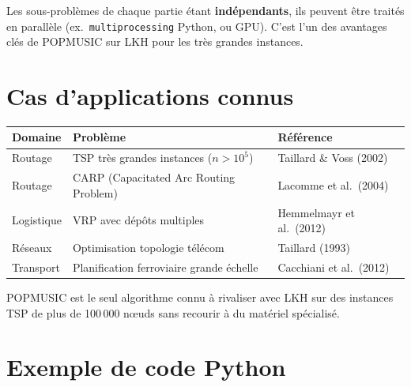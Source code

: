 \documentclass[11pt,a4paper]{article}
\begin{document}
\begin{tcolorbox}[remarque]
Les sous-problèmes de chaque partie étant \textbf{indépendants}, ils peuvent
être traités en parallèle (ex.\ \texttt{multiprocessing} Python, ou GPU).
C'est l'un des avantages clés de POPMUSIC sur LKH pour les très grandes
instances.
\end{tcolorbox}

\section{Cas d'applications connus}

\begin{center}
\begin{tabularx}{\textwidth}{llX}
  \toprule
  Domaine & Problème & Référence \\
  \midrule
  Routage & TSP très grandes instances ($n > 10^5$) & Taillard \& Voss (2002) \\
  Routage & CARP (Capacitated Arc Routing Problem) & Lacomme et al.\ (2004) \\
  Logistique & VRP avec dépôts multiples & Hemmelmayr et al.\ (2012) \\
  Réseaux & Optimisation topologie télécom & Taillard (1993) \\
  Transport & Planification ferroviaire grande échelle & Cacchiani et al.\ (2012) \\
  \bottomrule
\end{tabularx}
\end{center}

POPMUSIC est le seul algorithme connu à rivaliser avec LKH sur des instances
TSP de plus de 100\,000 nœuds sans recourir à du matériel spécialisé.

\section{Exemple de code Python}
\end{document}
